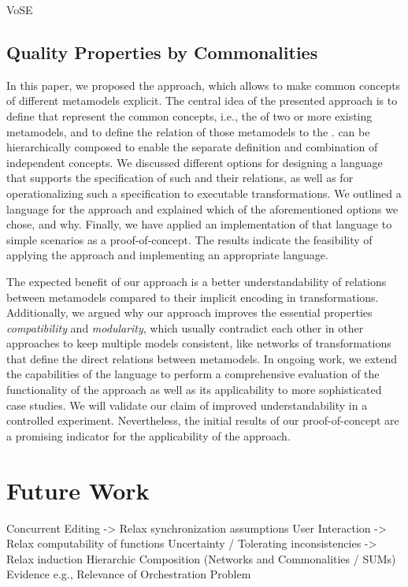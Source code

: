 \begin{copiedFrom}{VoSE}

\subsection*{Quality Properties by Commonalities}

In this paper, we proposed the \commonalities approach, which allows to make common concepts of different metamodels explicit.
The central idea of the presented approach 
is to define \emph{\conceptmetamodels} that represent the common concepts, i.e., the \commonalities of two or more existing metamodels, and to define the relation of those metamodels to the \conceptmetamodels.
\Conceptmetamodels can be hierarchically composed to enable the separate definition and combination of independent concepts.
We discussed different options for designing a language that supports the specification of such \commonalities and their relations, 
as well as for operationalizing such a specification to executable transformations.
We outlined a language for the \commonalities approach and explained %
which of the aforementioned options we chose, and why.
Finally, we have applied an implementation of that language to simple scenarios as a proof-of-concept.
The results indicate the feasibility of applying the \commonalities approach and implementing an appropriate language.

The expected benefit of our approach is a better understandability of relations between metamodels compared to their implicit encoding in transformations.
Additionally, we argued why our approach improves the essential properties \emph{compatibility} and \emph{modularity}, which usually contradict each other in other approaches to keep multiple models consistent, like networks of transformations that define the direct relations between metamodels.
In ongoing work, we extend the capabilities of the language to perform a comprehensive evaluation of the functionality of the approach as well as its applicability to more sophisticated case studies.
We will validate our claim of improved understandability in a controlled experiment.
Nevertheless, the initial results of our proof-of-concept are a promising indicator for the applicability of the \commonalities approach.

\end{copiedFrom} %



\section{Future Work}

Concurrent Editing -> Relax synchronization assumptions
User Interaction -> Relax computability of functions
Uncertainty / Tolerating inconsistencies -> Relax induction
Hierarchic Composition (Networks and Commonalities / SUMs)
Evidence
e.g., Relevance of Orchestration Problem 